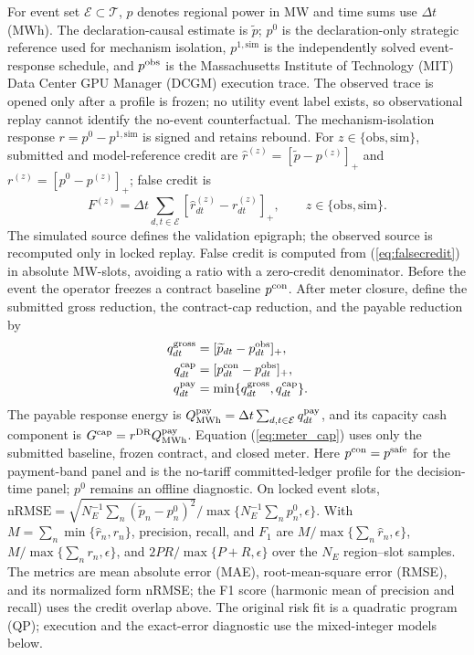 \documentclass[10pt,journal]{IEEEtran}
\newcommand{\dt}{\Delta t}
\begin{document}
For event set $\mathcal E\subset\mathcal T$, $p$ denotes regional power in
MW and time sums use $\dt$ (MWh). The declaration-causal estimate is
$\widetilde p$; $p^0$ is the declaration-only strategic reference used for
mechanism isolation, $p^{1,\mathrm{sim}}$ is the independently solved
event-response schedule, and $p^{\rm obs}$ is the Massachusetts Institute of Technology (MIT) Data Center GPU Manager (DCGM) execution trace. The observed
trace is opened only after a profile is frozen; no utility event label exists,
so observational replay cannot identify the no-event counterfactual. The mechanism-isolation response
$r=p^0-p^{1,\mathrm{sim}}$ is signed and retains rebound. For
$z\in\{\mathrm{obs},\mathrm{sim}\}$, submitted and model-reference credit are
$\widehat r^{(z)}=[\widetilde p-p^{(z)}]_+$ and
$r^{(z)}=[p^0-p^{(z)}]_+$; false credit is
\begin{equation}
 F^{(z)}=\dt\sum_{d,t\in\mathcal E}
 [\widehat r^{(z)}_{dt}-r^{(z)}_{dt}]_+,
 \qquad z\in\{\mathrm{obs},\mathrm{sim}\}.
 \label{eq:falsecredit}
\end{equation}
The simulated source defines the validation epigraph; the observed source is
recomputed only in locked replay. False credit is computed from
(\ref{eq:falsecredit}) in absolute MW-slots, avoiding a ratio with a zero-credit
denominator. Before the event the operator freezes a contract baseline
$p^{\rm con}$. After meter closure, define the submitted gross reduction, the
contract-cap reduction, and the payable reduction by
\begin{equation}
\begin{aligned}
q^{\rm gross}_{dt}&=[\widetilde p_{dt}-p^{\rm obs}_{dt}]_+,\\
q^{\rm cap}_{dt}&=[p^{\rm con}_{dt}-p^{\rm obs}_{dt}]_+,\\
q^{\rm pay}_{dt}&=\min\{q^{\rm gross}_{dt},q^{\rm cap}_{dt}\}.
\end{aligned}
\label{eq:meter_cap}
\end{equation}
The payable response energy is
$Q^{\rm pay}_{\rm MWh}=\dt\sum_{d,t\in\mathcal E}q^{\rm pay}_{dt}$, and its
capacity cash component is $G^{\rm cap}=r^{\rm DR}Q^{\rm pay}_{\rm MWh}$.
Equation (\ref{eq:meter_cap}) uses only the submitted baseline, frozen contract,
and closed meter. Here $p^{\rm con}=p^{\rm safe}$ for the payment-band panel
and is the no-tariff committed-ledger profile for the decision-time panel;
$p^0$ remains an offline diagnostic. On locked event slots,
$\mathrm{nRMSE}=\sqrt{N_E^{-1}\sum_n(\widetilde p_n-p^0_n)^2}/
\max\{N_E^{-1}\sum_n p^0_n,\epsilon\}$. With
$M=\sum_n\min\{\widehat r_n,r_n\}$, precision, recall, and $F_1$ are
$M/\max\{\sum_n\widehat r_n,\epsilon\}$,
$M/\max\{\sum_n r_n,\epsilon\}$, and
$2PR/\max\{P+R,\epsilon\}$ over the $N_E$ region--slot samples.
The metrics are mean absolute error (MAE), root-mean-square error (RMSE),
and its normalized form nRMSE; the F1 score (harmonic mean of precision and recall)
uses the credit overlap above. The original risk fit is a quadratic program (QP); execution
and the exact-error diagnostic use the mixed-integer models below.
\end{document}
